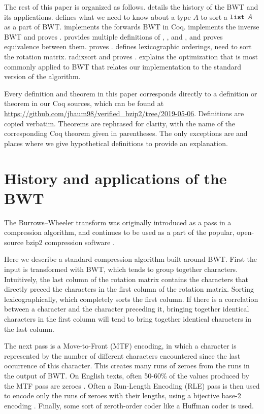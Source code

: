 \documentclass[sigplan,10pt,anonymous,review]{thesis}
\begin{document}
The rest of this paper is organized as follows.  details
the history of the BWT and its applications.  defines
what we need to know about a type $A$ to sort a $\texttt{list}~A$ as a
part of BWT.  implements the forwards BWT in
Coq.  implements the inverse BWT and proves
.  provides
multiple definitions of , , and
, and proves equivalence between them.
 proves . 
defines lexicographic orderings, need to sort the rotation matrix.
 radixsort and proves .
 explains the optimization that is most commonly applied
to BWT that relates our implementation to the standard version of the
algorithm.

Every definition and theorem in this paper corresponds directly to a
definition or theorem in our Coq sources, which can be found at
\url{https://github.com/jbaum98/verified_bzip2/tree/2019-05-06}.
Definitions are copied verbatim. Theorems are rephrased for clarity,
with the name of the corresponding Coq theorem given in parentheses.
The only exceptions are  and places where we give
hypothetical definitions to provide an explanation.

\section{History and applications of the BWT}
\label{sec:bwt}

The Burrows--Wheeler transform was originally introduced as a pass in a
compression algorithm, and continues to be used as a part of the
popular, open-source bzip2 compression software \cite{tsai_2016}.

Here we describe a standard compression algorithm built around BWT.
First the input is transformed with BWT, which tends to group together
characters. Intuitively, the last column of the rotation matrix
contains the characters that directly preced the characters in the
first column of the rotation matrix. Sorting lexicographically, which
completely sorts the first column. If there is a correlation between a
character and the character preceding it, bringing together identical
characters in the first column will tend to bring together identical
characters in the last column.

The next pass is a Move-to-Front (MTF) encoding, in which a character
is represented by the number of different characters encountered since
the last occurrence of this character. This creates many runs of zeroes
from the runs in the output of BWT. On English texts, often 50-60\% of
the values produced by the MTF pass are zeroes \cite{fenwick2007}.
Often a Run-Length Encoding (RLE) pass is then used to encode only the
runs of zeroes with their lengths, using a bijective base-2 encoding
\cite{bw-analysis, tsai_2016}. Finally, some sort of zeroth-order
coder like a Huffman coder is used.
\end{document}
